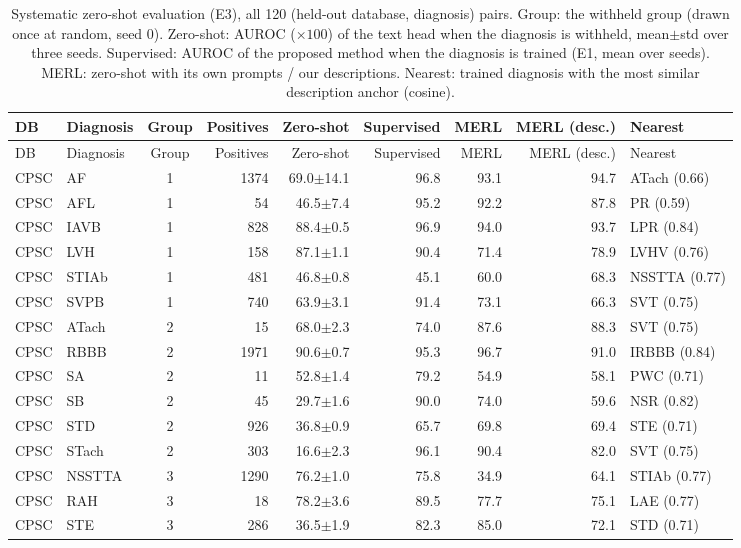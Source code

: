 \begin{longtable}{@{}llcrrrrrl@{}}
\caption{Systematic zero-shot evaluation (E3), all 120 (held-out database, diagnosis) pairs. Group: the withheld group (drawn once at random, seed 0). Zero-shot: AUROC ($\times100$) of the text head when the diagnosis is withheld, mean$\pm$std over three seeds. Supervised: AUROC of the proposed method when the diagnosis is trained (E1, mean over seeds). MERL: zero-shot with its own prompts / our descriptions. Nearest: trained diagnosis with the most similar description anchor (cosine).}\label{tab:e3pairs}\\
\toprule DB & Diagnosis & Group & Positives & Zero-shot & Supervised & MERL & MERL (desc.) & Nearest \\ \midrule \endfirsthead
\toprule DB & Diagnosis & Group & Positives & Zero-shot & Supervised & MERL & MERL (desc.) & Nearest \\ \midrule \endhead
\bottomrule \endfoot
CPSC & AF & 1 & 1374 & 69.0$\pm$14.1 & 96.8 & 93.1 & 94.7 & ATach (0.66) \\
CPSC & AFL & 1 & 54 & 46.5$\pm$7.4 & 95.2 & 92.2 & 87.8 & PR (0.59) \\
CPSC & IAVB & 1 & 828 & 88.4$\pm$0.5 & 96.9 & 94.0 & 93.7 & LPR (0.84) \\
CPSC & LVH & 1 & 158 & 87.1$\pm$1.1 & 90.4 & 71.4 & 78.9 & LVHV (0.76) \\
CPSC & STIAb & 1 & 481 & 46.8$\pm$0.8 & 45.1 & 60.0 & 68.3 & NSSTTA (0.77) \\
CPSC & SVPB & 1 & 740 & 63.9$\pm$3.1 & 91.4 & 73.1 & 66.3 & SVT (0.75) \\
CPSC & ATach & 2 & 15 & 68.0$\pm$2.3 & 74.0 & 87.6 & 88.3 & SVT (0.75) \\
CPSC & RBBB & 2 & 1971 & 90.6$\pm$0.7 & 95.3 & 96.7 & 91.0 & IRBBB (0.84) \\
CPSC & SA & 2 & 11 & 52.8$\pm$1.4 & 79.2 & 54.9 & 58.1 & PWC (0.71) \\
CPSC & SB & 2 & 45 & 29.7$\pm$1.6 & 90.0 & 74.0 & 59.6 & NSR (0.82) \\
CPSC & STD & 2 & 926 & 36.8$\pm$0.9 & 65.7 & 69.8 & 69.4 & STE (0.71) \\
CPSC & STach & 2 & 303 & 16.6$\pm$2.3 & 96.1 & 90.4 & 82.0 & SVT (0.75) \\
CPSC & NSSTTA & 3 & 1290 & 76.2$\pm$1.0 & 75.8 & 34.9 & 64.1 & STIAb (0.77) \\
CPSC & RAH & 3 & 18 & 78.2$\pm$3.6 & 89.5 & 77.7 & 75.1 & LAE (0.77) \\
CPSC & STE & 3 & 286 & 36.5$\pm$1.9 & 82.3 & 85.0 & 72.1 & STD (0.71) \\

\end{longtable}
